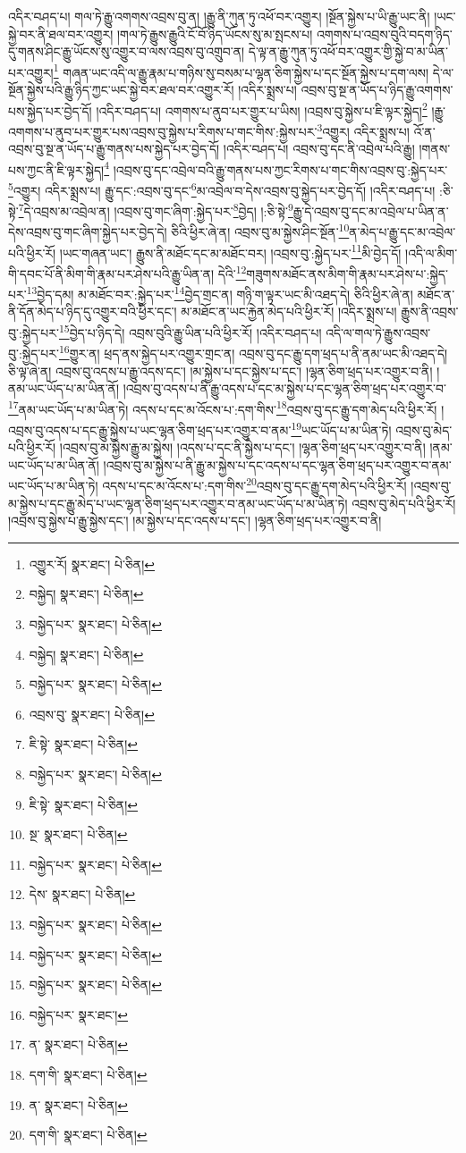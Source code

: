 འདིར་བཤད་པ། གལ་ཏེ་རྒྱུ་འགགས་འབྲས་བུ་ན། །རྒྱུ་ནི་ཀུན་ཏུ་འཕོ་བར་འགྱུར། །སྔོན་སྐྱེས་པ་ཡི་རྒྱུ་ཡང་ནི། །ཡང་སྐྱེ་བར་ནི་ཐལ་བར་འགྱུར། །གལ་ཏེ་རྒྱུས་རྒྱུའི་ངོ་བོ་ཉིད་ཡོངས་སུ་མ་སྤངས་པ། འགགས་པ་འབྲས་བུའི་བདག་ཉིད་དུ་གནས་ཤིང་རྒྱུ་ཡོངས་སུ་འགྱུར་བ་ལས་འབྲས་བུ་འགྲུབ་ན། དེ་ལྟ་ན་རྒྱུ་ཀུན་ཏུ་འཕོ་བར་འགྱུར་གྱི་སྐྱེ་བ་མ་ཡིན་པར་འགྱུར།\footnote{འགྱུར་རོ།  སྣར་ཐང་།  པེ་ཅིན། } གཞན་ཡང་འདི་ལ་རྒྱུ་རྣམ་པ་གཉིས་སུ་བསམ་པ་ལྷན་ཅིག་སྐྱེས་པ་དང་སྔོན་སྐྱེས་པ་དག་ལས། དེ་ལ་སྔོན་སྐྱེས་པའི་རྒྱུ་ཉིད་ཀྱང་ཡང་སྐྱེ་བར་ཐལ་བར་འགྱུར་རོ། །འདིར་སྨྲས་པ། འབྲས་བུ་སྔ་ན་ཡོད་པ་ཉིད་རྒྱུ་འགགས་པས་སྐྱེད་པར་བྱེད་དོ། །འདིར་བཤད་པ། འགགས་པ་ནུབ་པར་གྱུར་པ་ཡིས། །འབྲས་བུ་སྐྱེས་པ་ཇི་ལྟར་སྐྱེད།\footnote{བསྐྱེད།  སྣར་ཐང་།  པེ་ཅིན། } །རྒྱུ་འགགས་པ་ནུབ་པར་གྱུར་པས་འབྲས་བུ་སྐྱེས་པ་རིགས་པ་གང་གིས་:སྐྱེས་པར་\footnote{བསྐྱེད་པར་  སྣར་ཐང་།  པེ་ཅིན། }འགྱུར། འདིར་སྨྲས་པ། འོ་ན་འབྲས་བུ་སྔ་ན་ཡོད་པ་རྒྱུ་གནས་པས་སྐྱེད་པར་བྱེད་དོ། །འདིར་བཤད་པ། འབྲས་བུ་དང་ནི་འབྲེལ་པའི་རྒྱུ། །གནས་པས་ཀྱང་ནི་ཇི་ལྟར་སྐྱེད།\footnote{བསྐྱེད།  སྣར་ཐང་།  པེ་ཅིན། } །འབྲས་བུ་དང་འབྲེལ་བའི་རྒྱུ་གནས་པས་ཀྱང་རིགས་པ་གང་གིས་འབྲས་བུ་:སྐྱེད་པར་\footnote{བསྐྱེད་པར་  སྣར་ཐང་།  པེ་ཅིན། }འགྱུར། འདིར་སྨྲས་པ། རྒྱུ་དང་:འབྲས་བུ་དང་\footnote{འབྲས་བུ་  སྣར་ཐང་།  པེ་ཅིན། }མ་འབྲེལ་བ་དེས་འབྲས་བུ་སྐྱེད་པར་བྱེད་དོ། །འདིར་བཤད་པ། :ཅི་སྟེ་\footnote{ཇི་སྟེ་  སྣར་ཐང་།  པེ་ཅིན། }དེ་འབྲས་མ་འབྲེལ་ན། །འབྲས་བུ་གང་ཞིག་:སྐྱེད་པར་\footnote{བསྐྱེད་པར་  སྣར་ཐང་།  པེ་ཅིན། }བྱེད། །:ཅི་སྟེ་\footnote{ཇི་སྟེ་  སྣར་ཐང་།  པེ་ཅིན། }རྒྱུ་དེ་འབྲས་བུ་དང་མ་འབྲེལ་པ་ཡིན་ན་དེས་འབྲས་བུ་གང་ཞིག་སྐྱེད་པར་བྱེད་དེ། ཅིའི་ཕྱིར་ཞེ་ན། འབྲས་བུ་མ་སྐྱེས་ཤིང་སྔོན་\footnote{སྔ་  སྣར་ཐང་།  པེ་ཅིན། }ན་མེད་པ་རྒྱུ་དང་མ་འབྲེལ་པའི་ཕྱིར་རོ། །ཡང་གཞན་ཡང་། རྒྱུས་ནི་མཐོང་དང་མ་མཐོང་བར། །འབྲས་བུ་:སྐྱེད་པར་\footnote{བསྐྱེད་པར་  སྣར་ཐང་།  པེ་ཅིན། }མི་བྱེད་དོ། །འདི་ལ་མིག་གི་དབང་པོ་ནི་མིག་གི་རྣམ་པར་ཤེས་པའི་རྒྱུ་ཡིན་ན། དེའི་\footnote{དེས་  སྣར་ཐང་།  པེ་ཅིན། }གཟུགས་མཐོང་ནས་མིག་གི་རྣམ་པར་ཤེས་པ་:སྐྱེད་པར་\footnote{བསྐྱེད་པར་  སྣར་ཐང་།  པེ་ཅིན། }བྱེད་དམ། མ་མཐོང་བར་:སྐྱེད་པར་\footnote{བསྐྱེད་པར་  སྣར་ཐང་།  པེ་ཅིན། }བྱེད་གྲང་ན། གཉི་ག་ལྟར་ཡང་མི་འཐད་དེ། ཅིའི་ཕྱིར་ཞེ་ན། མཐོང་ན་ནི་དོན་མེད་པ་ཉིད་དུ་འགྱུར་བའི་ཕྱིར་དང་། མ་མཐོང་ན་ཡང་རྐྱེན་མེད་པའི་ཕྱིར་རོ། །འདིར་སྨྲས་པ། རྒྱུས་ནི་འབྲས་བུ་:སྐྱེད་པར་\footnote{བསྐྱེད་པར་  སྣར་ཐང་།  པེ་ཅིན། }བྱེད་པ་ཉིད་དེ། འབྲས་བུའི་རྒྱུ་ཡིན་པའི་ཕྱིར་རོ། །འདིར་བཤད་པ། འདི་ལ་གལ་ཏེ་རྒྱུས་འབྲས་བུ་:སྐྱེད་པར་\footnote{བསྐྱེད་པར་  སྣར་ཐང་། }གྱུར་ན། ཕྲད་ནས་སྐྱེད་པར་འགྱུར་གྲང་ན། འབྲས་བུ་དང་རྒྱུ་དག་ཕྲད་པ་ནི་ནམ་ཡང་མི་འཐད་དེ། ཅི་ལྟ་ཞེ་ན། འབྲས་བུ་འདས་པ་རྒྱུ་འདས་དང་། །མ་སྐྱེས་པ་དང་སྐྱེས་པ་དང་། །ལྷན་ཅིག་ཕྲད་པར་འགྱུར་བ་ནི། །ནམ་ཡང་ཡོད་པ་མ་ཡིན་ནོ། །འབྲས་བུ་འདས་པ་ནི་རྒྱུ་འདས་པ་དང་མ་སྐྱེས་པ་དང་ལྷན་ཅིག་ཕྲད་པར་འགྱུར་བ་\footnote{ན་  སྣར་ཐང་།  པེ་ཅིན། }ནམ་ཡང་ཡོད་པ་མ་ཡིན་ཏེ། འདས་པ་དང་མ་འོངས་པ་:དག་གིས་\footnote{དག་གི་  སྣར་ཐང་།  པེ་ཅིན། }འབྲས་བུ་དང་རྒྱུ་དག་མེད་པའི་ཕྱིར་རོ། །འབྲས་བུ་འདས་པ་དང་རྒྱུ་སྐྱེས་པ་ཡང་ལྷན་ཅིག་ཕྲད་པར་འགྱུར་བ་ནམ་\footnote{ན་  སྣར་ཐང་།  པེ་ཅིན། }ཡང་ཡོད་པ་མ་ཡིན་ཏེ། འབྲས་བུ་མེད་པའི་ཕྱིར་རོ། །འབྲས་བུ་མ་སྐྱེས་རྒྱུ་མ་སྐྱེས། །འདས་པ་དང་ནི་སྐྱེས་པ་དང་། །ལྷན་ཅིག་ཕྲད་པར་འགྱུར་བ་ནི། །ནམ་ཡང་ཡོད་པ་མ་ཡིན་ནོ། །འབྲས་བུ་མ་སྐྱེས་པ་ནི་རྒྱུ་མ་སྐྱེས་པ་དང་འདས་པ་དང་ལྷན་ཅིག་ཕྲད་པར་འགྱུར་བ་ནམ་ཡང་ཡོད་པ་མ་ཡིན་ཏེ། འདས་པ་དང་མ་འོངས་པ་:དག་གིས་\footnote{དག་གི་  སྣར་ཐང་།  པེ་ཅིན། }འབྲས་བུ་དང་རྒྱུ་དག་མེད་པའི་ཕྱིར་རོ། །འབྲས་བུ་མ་སྐྱེས་པ་དང་རྒྱུ་མེད་པ་ཡང་ལྷན་ཅིག་ཕྲད་པར་འགྱུར་བ་ནམ་ཡང་ཡོད་པ་མ་ཡིན་ཏེ། འབྲས་བུ་མེད་པའི་ཕྱིར་རོ། །འབྲས་བུ་སྐྱེས་པ་རྒྱུ་སྐྱེས་དང་། །མ་སྐྱེས་པ་དང་འདས་པ་དང་། །ལྷན་ཅིག་ཕྲད་པར་འགྱུར་བ་ནི། 